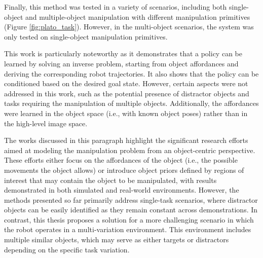 Finally, this method was tested in a variety of scenarios, including both single-object and multiple-object manipulation with different manipulation primitives (Figure \ref{fig:plato_task}). However, in the multi-object scenarios, the system was only tested on single-object manipulation primitives.

This work is particularly noteworthy as it demonstrates that a policy can be learned by solving an inverse problem, starting from object affordances and deriving the corresponding robot trajectories. It also shows that the policy can be conditioned based on the desired goal state. However, certain aspects were not addressed in this work, such as the potential presence of distractor objects and tasks requiring the manipulation of multiple objects. Additionally, the affordances were learned in the object space (i.e., with known object poses) rather than in the high-level image space.

The works discussed in this paragraph highlight the significant research efforts aimed at modeling the manipulation problem from an object-centric perspective. These efforts either focus on the affordances of the object (i.e., the possible movements the object allows) or introduce object priors defined by regions of interest that may contain the object to be manipulated, with results demonstrated in both simulated and real-world environments. However, the methods presented so far primarily address single-task scenarios, where distractor objects can be easily identified as they remain constant across demonstrations. In contrast, this thesis proposes a solution for a more challenging scenario in which the robot operates in a multi-variation environment. This environment includes multiple similar objects, which may serve as either targets or distractors depending on the specific task variation.
